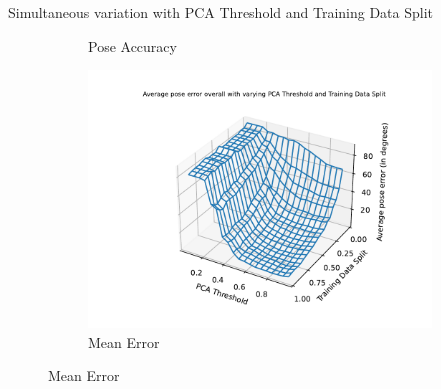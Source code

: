 \documentclass[aspectratio=169, handout, 10pt, hyperref=colorlinks]{beamer}
\begin{document}
\begin{frame}{Simultaneous variation with PCA Threshold and Training Data Split}
\begin{figure}
\begin{subfigure}{0.32\linewidth}
            \caption{Pose Accuracy}
        \end{subfigure}
        \begin{subfigure}{0.32\linewidth}
            \centering
            \includegraphics[width=\linewidth]{combined/mean_error_overall.pdf}
            \caption{Mean Error}
        \end{subfigure}
    \end{figure}
\end{frame}
\end{document}
